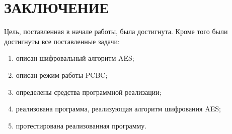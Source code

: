 \chapter*{\hfill{\centering  ЗАКЛЮЧЕНИЕ}\hfill}

Цель, поставленная в начале работы, была достигнута. 
Кроме того были достигнуты все поставленные задачи:
\begin{enumerate}
	\item описан шифровальный алгоритм AES;
	\item описан режим работы PCBC;
	\item определены средства программной реализации;
	\item реализована программа, реализующая алгоритм шифрования AES;
	\item протестирована реализованная программу.
\end{enumerate}
